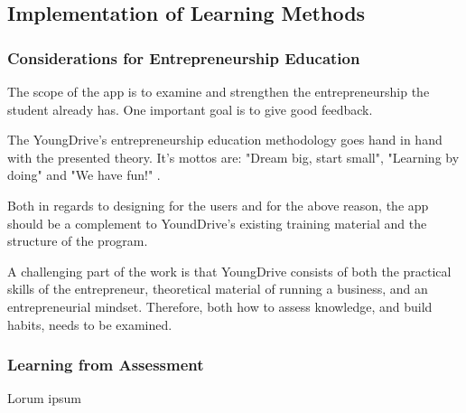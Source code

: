\subsection{Implementation of Learning Methods}

\subsubsection{Considerations for Entrepreneurship Education}
The scope of the app is to examine and strengthen the entrepreneurship the student already has. One important goal is to give good feedback.

The YoungDrive's entrepreneurship education methodology goes hand in hand with the presented theory. It's mottos are: "Dream big, start small", "Learning by doing" and "We have fun!" \cite{youngdrive}.

Both in regards to designing for the users and for the above reason, the app should be a complement to YoundDrive's existing training material and the structure of the program.

A challenging part of the work is that YoungDrive consists of both the practical skills of the entrepreneur, theoretical material of running a business, and an entrepreneurial mindset. Therefore, both how to assess knowledge, and build habits, needs to be examined.

\subsubsection{Learning from Assessment}

Lorum ipsum
